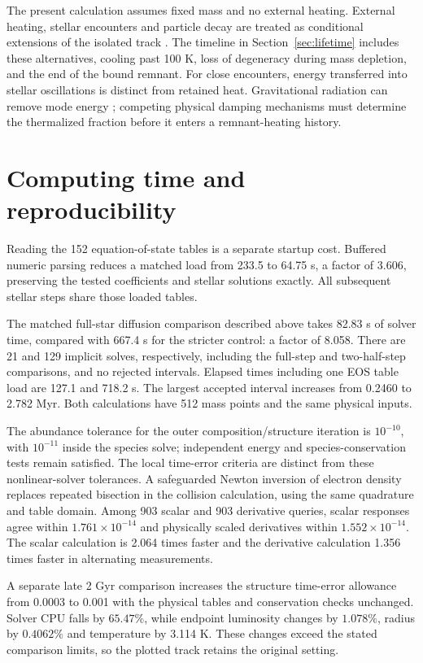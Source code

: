 \documentclass[11pt,letterpaper]{article}
\begin{document}
The present calculation assumes fixed mass and no external heating.
External heating, stellar encounters and particle decay are treated as
conditional extensions of the isolated track \cite{adams97}. The timeline
in Section~\ref{sec:lifetime} includes these alternatives, cooling past 100 K,
loss of degeneracy during mass depletion, and the end of the bound remnant.
For close encounters, energy transferred into stellar oscillations is distinct
from retained heat. Gravitational radiation can remove mode energy
\cite{rathore05}; competing physical damping mechanisms must determine the
thermalized fraction before it enters a remnant-heating history.

\section{Computing time and reproducibility}
Reading the 152 equation-of-state tables is a separate startup cost.
Buffered numeric parsing reduces a matched load from 233.5 to 64.75 s,
a factor of 3.606, preserving the tested coefficients and stellar solutions
exactly. All subsequent stellar steps share those loaded tables.

The matched full-star diffusion comparison described above takes 82.83 s
of solver time, compared with 667.4 s for the stricter control: a factor
of 8.058. There are 21 and 129 implicit solves, respectively, including the
full-step and two-half-step comparisons, and no rejected intervals.
Elapsed times including one EOS table load are 127.1 and 718.2 s.
The largest accepted interval increases from 0.2460 to 2.782 Myr.
Both calculations have 512 mass points and the same physical inputs.

The abundance tolerance for the outer composition/structure iteration is
$10^{-10}$, with $10^{-11}$ inside the species solve; independent energy
and species-conservation tests remain satisfied. The local time-error
criteria are distinct from these nonlinear-solver tolerances. A safeguarded
Newton inversion of electron density replaces repeated bisection in the
collision calculation, using the same quadrature and table domain.
Among 903 scalar and 903 derivative queries, scalar responses agree within
$1.761\times10^{-14}$ and physically scaled derivatives within
$1.552\times10^{-14}$. The scalar calculation is 2.064 times faster and
the derivative calculation 1.356 times faster in alternating measurements.

A separate late 2 Gyr comparison increases the structure time-error
allowance from 0.0003 to 0.001 with the physical tables and conservation
checks unchanged. Solver CPU falls by $65.47\%$, while endpoint
luminosity changes by $1.078\%$, radius by $0.4062\%$ and temperature
by 3.114 K. These changes exceed the stated comparison limits, so the
plotted track retains the original setting.
\end{document}
